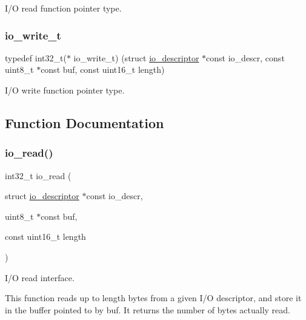 I/O read function pointer type. 

\mbox{\label{group__doc__driver__hal__helper__io_gacb03c48993a6786f00946c196c40add1}} 
\subsubsection{\texorpdfstring{io\+\_\+write\+\_\+t}{io\_write\_t}}
{\footnotesize\ttfamily typedef int32\+\_\+t($\ast$ io\+\_\+write\+\_\+t) (struct \hyperlink{structio__descriptor}{io\+\_\+descriptor} $\ast$const io\+\_\+descr, const uint8\+\_\+t $\ast$const buf, const uint16\+\_\+t length)}



I/O write function pointer type. 



\subsection{Function Documentation}
\mbox{\label{group__doc__driver__hal__helper__io_gaf5e8722129933fa8e014144fd7505be6}} 
\subsubsection{\texorpdfstring{io\+\_\+read()}{io\_read()}}
{\footnotesize\ttfamily int32\+\_\+t io\+\_\+read (\begin{DoxyParamCaption}\item[{struct \hyperlink{structio__descriptor}{io\+\_\+descriptor} $\ast$const}]{io\+\_\+descr,  }\item[{uint8\+\_\+t $\ast$const}]{buf,  }\item[{const uint16\+\_\+t}]{length }\end{DoxyParamCaption})}



I/O read interface. 

This function reads up to {\ttfamily length} bytes from a given I/O descriptor, and store it in the buffer pointed to by {\ttfamily buf}. It returns the number of bytes actually read.


